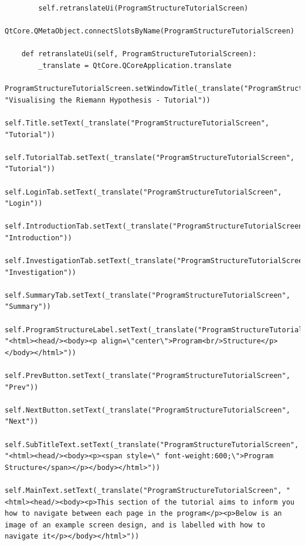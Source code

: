\documentclass{article}
\begin{document}
\begin{lstlisting}
        self.retranslateUi(ProgramStructureTutorialScreen)
        QtCore.QMetaObject.connectSlotsByName(ProgramStructureTutorialScreen)

    def retranslateUi(self, ProgramStructureTutorialScreen):
        _translate = QtCore.QCoreApplication.translate
        ProgramStructureTutorialScreen.setWindowTitle(_translate("ProgramStructureTutorialScreen", "Visualising the Riemann Hypothesis - Tutorial"))
        self.Title.setText(_translate("ProgramStructureTutorialScreen", "Tutorial"))
        self.TutorialTab.setText(_translate("ProgramStructureTutorialScreen", "Tutorial"))
        self.LoginTab.setText(_translate("ProgramStructureTutorialScreen", "Login"))
        self.IntroductionTab.setText(_translate("ProgramStructureTutorialScreen", "Introduction"))
        self.InvestigationTab.setText(_translate("ProgramStructureTutorialScreen", "Investigation"))
        self.SummaryTab.setText(_translate("ProgramStructureTutorialScreen", "Summary"))
        self.ProgramStructureLabel.setText(_translate("ProgramStructureTutorialScreen", "<html><head/><body><p align=\"center\">Program<br/>Structure</p></body></html>"))
        self.PrevButton.setText(_translate("ProgramStructureTutorialScreen", "Prev"))
        self.NextButton.setText(_translate("ProgramStructureTutorialScreen", "Next"))
        self.SubTitleText.setText(_translate("ProgramStructureTutorialScreen", "<html><head/><body><p><span style=\" font-weight:600;\">Program Structure</span></p></body></html>"))
        self.MainText.setText(_translate("ProgramStructureTutorialScreen", "<html><head/><body><p>This section of the tutorial aims to inform you how to navigate between each page in the program</p><p>Below is an image of an example screen design, and is labelled with how to navigate it</p></body></html>"))
\end{lstlisting}
\end{document}
